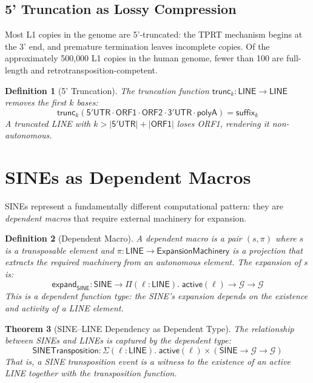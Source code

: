 \documentclass[12pt,a4paper]{article}
\newtheorem{theorem}{Theorem}[section]
\newtheorem{definition}[theorem]{Definition}
\newcommand{\Genome}{\mathcal{G}}
\newcommand{\LINE}{\mathsf{LINE}}
\newcommand{\SINE}{\mathsf{SINE}}
\begin{document}
\subsection{5' Truncation as Lossy Compression}

Most L1 copies in the genome are 5'-truncated: the TPRT mechanism begins at the 3' end,
and premature termination leaves incomplete copies. Of the approximately 500{,}000
L1 copies in the human genome, fewer than 100 are full-length and retrotransposition-competent.

\begin{definition}[5' Truncation]\label{def:truncation}
The \emph{truncation function} $\mathsf{trunc}_k : \LINE \to \LINE$ removes the first
$k$ bases:
\[
  \mathsf{trunc}_k(\mathsf{5'UTR} \cdot \mathsf{ORF1} \cdot \mathsf{ORF2} \cdot \mathsf{3'UTR} \cdot \mathsf{polyA})
  = \mathsf{suffix}_k
\]
A truncated LINE with $k > |\mathsf{5'UTR}| + |\mathsf{ORF1}|$ loses ORF1, rendering
it non-autonomous.
\end{definition}


\section{SINEs as Dependent Macros}\label{sec:sines}

SINEs represent a fundamentally different computational pattern: they are
\emph{dependent macros} that require external machinery for expansion.

\begin{definition}[Dependent Macro]\label{def:dep-macro}
A \emph{dependent macro} is a pair $(s, \pi)$ where $s$ is a transposable element
and $\pi : \LINE \to \mathsf{ExpansionMachinery}$ is a projection that extracts the
required machinery from an autonomous element. The expansion of $s$ is:
\[
  \mathsf{expand}_\SINE : \SINE \to \Pi(\ell : \LINE).\; \mathsf{active}(\ell) \to \Genome \to \Genome
\]
This is a \emph{dependent function type}: the SINE's expansion depends on the existence
and activity of a LINE element.
\end{definition}

\begin{theorem}[SINE--LINE Dependency as Dependent Type]\label{thm:sine-dep}
The relationship between SINEs and LINEs is captured by the dependent type:
\[
  \mathsf{SINETransposition} : \Sigma(\ell : \LINE).\; \mathsf{active}(\ell) \times (\SINE \to \Genome \to \Genome)
\]
That is, a SINE transposition event is a \emph{witness} to the existence of an active
LINE together with the transposition function.
\end{theorem}
\end{document}
